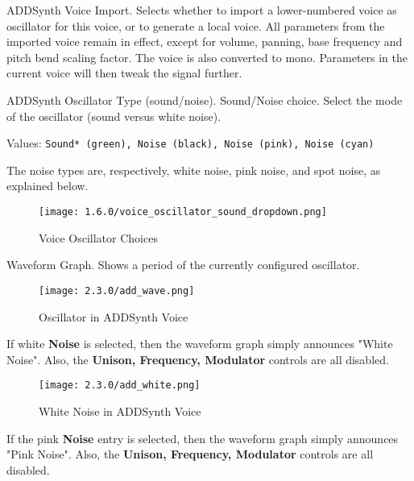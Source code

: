    \setcounter{ItemCounter}{0}      %

  ADDSynth Voice Import. Selects whether to import a lower-numbered voice as
  oscillator for this voice, or to generate a local voice. All parameters from
  the imported voice remain in effect, except for volume, panning, base
  frequency and pitch bend scaling factor. The voice is also converted to mono.
  Parameters in the current voice will then tweak the signal further.

   ADDSynth Oscillator Type (sound/noise).
   Sound/Noise choice.
   Select the mode of the oscillator (sound versus white noise).

   Values: \texttt{Sound* (green), Noise (black), Noise (pink), Noise (cyan)}

   The noise types are, respectively, white noise, pink noise, and spot noise, as
   explained below.

\begin{figure}[H]
   \centering
   \texttt{[image: 1.6.0/voice\_oscillator\_sound\_dropdown.png]}
   \caption{Voice Oscillator Choices}
   \label{fig:voice_oscillator_choices}
\end{figure}

   Waveform Graph.
   Shows a period of the currently configured oscillator.

\begin{figure}[H]
   \centering
   \texttt{[image: 2.3.0/add\_wave.png]}
   \caption{Oscillator in ADDSynth Voice}
   \label{fig:voice_oscillator_oscillator}
\end{figure}

   If white \textbf{Noise} is selected, then the waveform graph simply announces
   "White Noise".  Also, the \textbf{Unison, Frequency, Modulator} controls are
   all disabled.

\begin{figure}[H]
   \centering
   \texttt{[image: 2.3.0/add\_white.png]}
   \caption{White Noise in ADDSynth Voice}
   \label{fig:voice_oscillator_white_noise}
\end{figure}

   If the pink \textbf{Noise} entry is selected,
   then the waveform graph simply announces "Pink Noise".
   Also, the \textbf{Unison, Frequency, Modulator} controls are
   all disabled.

